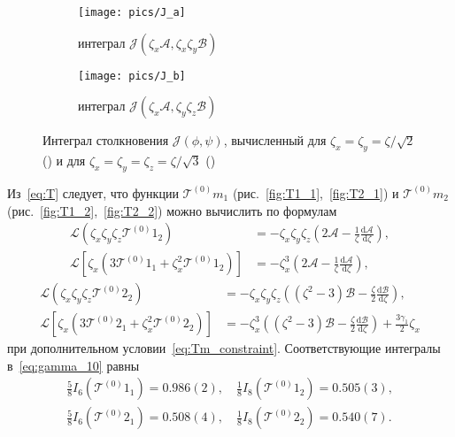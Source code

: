 \documentclass[a4paper,12pt]{article}
\newcommand{\dd}{\mathrm{d}}
\newcommand{\der}[2][]{\frac{\dd#1}{\dd#2}}
\newcommand{\T}[1][0]{\ensuremath{\mathcal{T}^{(#1)}}}
\begin{document}
\begin{figure}
    \centering
    \begin{subfigure}[b]{.5\linewidth}
        \centering
        \texttt{[image: pics/J\_a]}
    	\caption{интеграл \(\mathcal{J}\left( \zeta_x\mathcal{A}, \zeta_x\zeta_y\mathcal{B} \right)\)}\label{fig:J_a}
    \end{subfigure}%
    \begin{subfigure}[b]{.5\linewidth}
        \centering
        \texttt{[image: pics/J\_b]}
    	\caption{интеграл \(\mathcal{J}\left( \zeta_x\mathcal{A}, \zeta_y\zeta_z\mathcal{B} \right)\)}\label{fig:J_b}
    \end{subfigure}
    \caption{Интеграл столкновения \(\mathcal{J}(\phi,\psi)\),
        вычисленный для \(\zeta_x=\zeta_y=\zeta/\sqrt2\) ()
        и для \(\zeta_x=\zeta_y=\zeta_z=\zeta/\sqrt3\) () }
    \label{fig:J_allT}
\end{figure}


Из~\eqref{eq:T} следует, что функции \(\T{m}_1\) (рис.~\ref{fig:T1_1},~\ref{fig:T2_1})
и \(\T{m}_2\) (рис.~\ref{fig:T1_2},~\ref{fig:T2_2}) можно вычислить по формулам
\begin{align}
    \mathcal{L}\left( \zeta_x\zeta_y\zeta_z\T{1}_2 \right)
        &= -\zeta_x\zeta_y\zeta_z\left(2\mathcal{A} - \frac1\zeta\der[\mathcal{A}]{\zeta}\right), \label{eq:T2a}\\
    \mathcal{L}\left[ \zeta_x\left(3\T{1}_1 + \zeta_x^2\T{1}_2\right) \right]
        &= -\zeta_x^3\left(2\mathcal{A} - \frac1\zeta\der[\mathcal{A}]{\zeta}\right), \label{eq:T1a}
\end{align}
\begin{align}
    \mathcal{L}\left( \zeta_x\zeta_y\zeta_z\T{2}_2 \right)
        &= -\zeta_x\zeta_y\zeta_z\left((\zeta^2-3)\mathcal{B} - \frac\zeta2\der[\mathcal{B}]{\zeta}\right), \label{eq:T2b}\\
    \mathcal{L}\left[ \zeta_x\left(3\T{2}_1 + \zeta_x^2\T{2}_2\right) \right]
        &= -\zeta_x^3\left((\zeta^2-3)\mathcal{B} - \frac\zeta2\der[\mathcal{B}]{\zeta}\right) + \frac{3\gamma_1}{2}\zeta_x \label{eq:T1b}
\end{align}
при дополнительном условии~\eqref{eq:Tm_constraint}.
Соответствующие интегралы в~\eqref{eq:gamma_10} равны
\begin{gather}
    \frac58 I_6\left(\T{1}_1\right) = 0.986(2), \quad \frac18 I_8\left(\T{1}_2\right) = 0.505(3), \label{eq:gamma10a}\\
    \frac58 I_6\left(\T{2}_1\right) = 0.508(4), \quad \frac18 I_8\left(\T{2}_2\right) = 0.540(7). \label{eq:gamma10b}
\end{gather}
\end{document}
